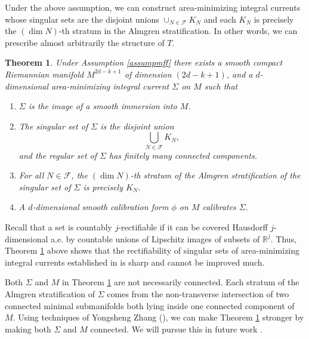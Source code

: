\documentclass[11pt,a4paper]{amsart}
\numberwithin{equation}{section}
\newcommand{\mff}{\mathcal{F}}
\newcommand{\Si}{\Sigma}
\newcommand{\R}{\mathbb{R}}
\theoremstyle{plain}
\newtheorem{thm}{Theorem}
\theoremstyle{definition}
\numberwithin{equation}{subsection}
\begin{document}
Under the above assumption, we can construct area-minimizing integral currents whose singular sets are the disjoint unions $\cup_{N\in \mff}K_N$ and each $K_N$ is precisely the $(\dim N)$-th stratum in the Almgren stratification. In other words, we can prescribe almost arbitrarily the structure of $T.$ 
\begin{thm}\label{thmi}Under Assumption \ref{assumpmff} there exists a smooth compact Riemannian manifold $M^{2d-k+1}$ of dimension $(2d-k+1)$, and  a $d$-dimensional area-minimizing integral current $\Si$ on $M$ such that
\begin{enumerate}
\item $\Si$ is the image of a smooth immersion into $M$. %
\item The singular set of $\Si$ is the disjoint union $$\bigcup_{N\in\mff}K_N,$$   and the regular set of $\Si$ has finitely many connected components.
\item For all $N\in \mff $, the $(\dim N)$-th stratum of the Almgren stratification of the singular set of $\Si$ is precisely $K_N.$
\item A $d$-dimensional smooth calibration form $\phi$ on $M$ calibrates $\Si.$
\end{enumerate} 
\end{thm}
Recall that a set is countably $j$-rectifiable if it can be covered Hausdorff $j$-dimensional a.e. by countable unions of Lipschitz images of subsets of $\R^j.$ Thus,  Theorem \ref{thmi} above shows that the rectifiability of singular sets of area-minimizing integral currents established in \cite{DMS1,DMS2,DMS3,BK1,BK2,BK3} is sharp and cannot be improved much.

Both $\Si$ and $M$ in Theorem \ref{thmi} are not necessarily connected. Each stratum of the Almgren stratification of $\Si$ comes from the non-transverse intersection of two connected minimal submanifolds both lying inside one connected component of $M.$ Using techniques of Yongsheng Zhang (\cite{YZj,YZa}), we can make Theorem \ref{thmi} stronger by making both $\Si$ and $M$ connected. We will pursue this in future work \cite{ZLa2}. 
\end{document}
